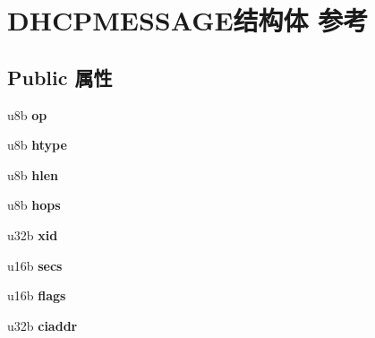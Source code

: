 \hypertarget{struct_d_h_c_p_m_e_s_s_a_g_e}{}\section{D\+H\+C\+P\+M\+E\+S\+S\+A\+G\+E结构体 参考}
\label{struct_d_h_c_p_m_e_s_s_a_g_e}
\subsection*{Public 属性}
\begin{DoxyCompactItemize}
\item 
\mbox{\label{struct_d_h_c_p_m_e_s_s_a_g_e_acb48c864c684b6fc74deae4b2fd85132}} 
u8b {\bfseries op}
\item 
\mbox{\label{struct_d_h_c_p_m_e_s_s_a_g_e_af8e301d672c5d8b906665fb7682d44ba}} 
u8b {\bfseries htype}
\item 
\mbox{\label{struct_d_h_c_p_m_e_s_s_a_g_e_aa6789f17bcbcb0feb93c226939d1c045}} 
u8b {\bfseries hlen}
\item 
\mbox{\label{struct_d_h_c_p_m_e_s_s_a_g_e_ad902d0a5f64ed1739d24e61c48b34db7}} 
u8b {\bfseries hops}
\item 
\mbox{\label{struct_d_h_c_p_m_e_s_s_a_g_e_a91f3e0a63c1bae4f648d4e9dd0960e45}} 
u32b {\bfseries xid}
\item 
\mbox{\label{struct_d_h_c_p_m_e_s_s_a_g_e_a47944f6d3dbda6c5446e8065ed40c7ec}} 
u16b {\bfseries secs}
\item 
\mbox{\label{struct_d_h_c_p_m_e_s_s_a_g_e_ac9e5d7cc4af4b4e86794b08eae0fb5b7}} 
u16b {\bfseries flags}
\item 
\mbox{\label{struct_d_h_c_p_m_e_s_s_a_g_e_a38c2c504d8c10df7c068deb86a26614f}} 
u32b {\bfseries ciaddr}
\item 
\mbox{\label{struct_d_h_c_p_m_e_s_s_a_g_e_a1d76eb062f234e2fec07c9d79c2fc25d}} 

\end{DoxyCompactItemize}
